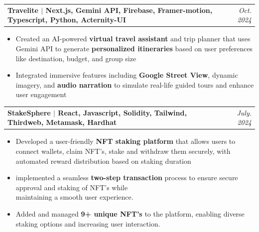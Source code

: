 \documentclass[a4paper,11pt]{article}
\makeatletter
\newcommand{\resumeProject}[2]{
\vspace{0.5mm}\item
    \begin{tabular*}{0.98\textwidth}[t]{l@{\extracolsep{\fill}}r}
        \textbf{#1} & \textit{\footnotesize{#2}}
    \end{tabular*}
    \vspace{-2.4mm}
}
\newcommand{\resumeItemListStart}{\begin{justify}\begin{itemize}[leftmargin=3ex, rightmargin=2ex, noitemsep,labelsep=1.2mm,itemsep=0mm]\small}
\newcommand{\resumeItemListEnd}{\end{itemize}\end{justify}\vspace{-2mm}}
\makeatother
\begin{document}
    \resumeProject
      {{Travelite} $|$ {Next.js, Gemini API, Firebase, Framer-motion, Typescript, Python, Acternity-UI } \href{https://github.com/Akshansh029/Travelite}{\faGithub}} %
      {Oct. 2024} %
        
      \resumeItemListStart
            \item{Created an AI-powered \textbf{virtual travel assistant} and trip planner that uses Gemini API to generate \textbf{personalized itineraries} based on user preferences like destination, budget, and group size}
            \item{Integrated immersive features including \textbf{Google Street View}, dynamic imagery, and \textbf{audio narration} to simulate real-life guided tours and enhance user engagement}
          \resumeItemListEnd

        

    \resumeProject
      {{StakeSphere} $|$ {React, Javascript, Solidity, Tailwind, Thirdweb, Metamask, Hardhat} \href{https://github.com/Aytaditya/NFT_Staking_app}{\faGithub}} %
      {July. 2024} %
        
      \resumeItemListStart
            \item{Developed a user-friendly \textbf{NFT staking platform} that allows users to connect wallets, claim NFT's, stake and withdraw them securely, with automated reward distribution based on staking duration}
            \item{implemented a seamless \textbf{two-step transaction} process to ensure secure approval and staking of NFT's while \\maintaining a smooth user experience.}
            \item {Added and managed \textbf{9+ unique NFT's} to the platform, enabling diverse staking options and increasing user interaction.}
          \resumeItemListEnd
    
\end{document}
